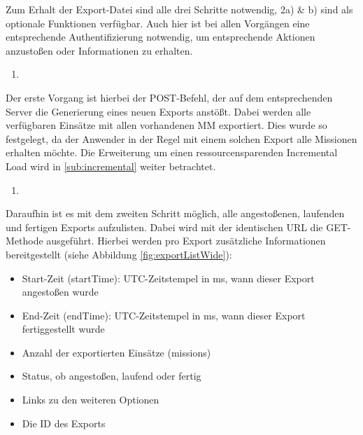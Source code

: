 Zum Erhalt der Export-Datei sind alle drei Schritte notwendig, 2a) \& b) sind als optionale Funktionen verfügbar.
Auch hier ist bei allen Vorgängen eine entsprechende Authentifizierung notwendig, um entsprechende Aktionen anzustoßen oder Informationen zu erhalten.

\begin{enumerate}
\item {}
\end{enumerate}
Der erste Vorgang ist hierbei der POST-Befehl, der auf dem entsprechenden Server die Generierung eines neuen Exports anstößt.
Dabei werden alle verfügbaren Einsätze mit allen vorhandenen \gls{MM} exportiert.
Dies wurde so festgelegt, da der Anwender in der Regel mit einem solchen Export alle Missionen erhalten möchte.
Die Erweiterung um einen ressourcensparenden \glqq Incremental Load\grqq{} wird in \ref{sub:incremental} weiter betrachtet.

\begin{enumerate}[resume]
\item {}
\end{enumerate}

Daraufhin ist es mit dem zweiten Schritt möglich, alle angestoßenen, laufenden und fertigen Exports aufzulisten.
Dabei wird mit der identischen URL die GET-Methode ausgeführt.
Hierbei werden pro Export zusätzliche Informationen bereitgestellt (siehe Abbildung \ref{fig:exportListWide}): 


\begin{itemize}
\item Start-Zeit (\glqq startTime\grqq): UTC-Zeitstempel in ms, wann dieser Export angestoßen wurde
\item End-Zeit (\glqq endTime\grqq): UTC-Zeitstempel in ms, wann dieser Export fertiggestellt wurde
\item Anzahl der exportierten Einsätze (\glqq missions\grqq)
\item Status, ob angestoßen, laufend oder fertig
\item Links zu den weiteren Optionen
\item Die ID des Exports
\end{itemize}

